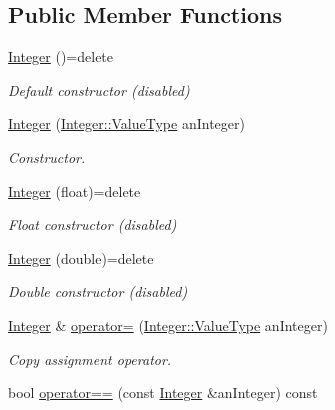 \subsection*{Public Member Functions}
\begin{DoxyCompactItemize}
\item 
\hyperlink{classlibrary_1_1core_1_1types_1_1_integer_a6483b1c4e13e5ed6af5e7a58347efead}{Integer} ()=delete
\begin{DoxyCompactList}\small\item\em Default constructor (disabled) \end{DoxyCompactList}\item 
\hyperlink{classlibrary_1_1core_1_1types_1_1_integer_ac282b8e24c1d1a43e578c5be3c70ea27}{Integer} (\hyperlink{classlibrary_1_1core_1_1types_1_1_integer_a623afb1580f870fd8a1997b1c12c917d}{Integer\+::\+Value\+Type} an\+Integer)
\begin{DoxyCompactList}\small\item\em Constructor. \end{DoxyCompactList}\item 
\hyperlink{classlibrary_1_1core_1_1types_1_1_integer_af3bcebe374c4b7b4329ed0a7fae04abd}{Integer} (float)=delete
\begin{DoxyCompactList}\small\item\em Float constructor (disabled) \end{DoxyCompactList}\item 
\hyperlink{classlibrary_1_1core_1_1types_1_1_integer_ab0d94d5cfc78f38f1598679015f4ab61}{Integer} (double)=delete
\begin{DoxyCompactList}\small\item\em Double constructor (disabled) \end{DoxyCompactList}\item 
\hyperlink{classlibrary_1_1core_1_1types_1_1_integer}{Integer} \& \hyperlink{classlibrary_1_1core_1_1types_1_1_integer_ab77cae94a9e6d4a405a555dd55763ea2}{operator=} (\hyperlink{classlibrary_1_1core_1_1types_1_1_integer_a623afb1580f870fd8a1997b1c12c917d}{Integer\+::\+Value\+Type} an\+Integer)
\begin{DoxyCompactList}\small\item\em Copy assignment operator. \end{DoxyCompactList}\item 
bool \hyperlink{classlibrary_1_1core_1_1types_1_1_integer_a52b3a012d6c6779773d051800daac516}{operator==} (const \hyperlink{classlibrary_1_1core_1_1types_1_1_integer}{Integer} \&an\+Integer) const

\end{DoxyCompactItemize}
